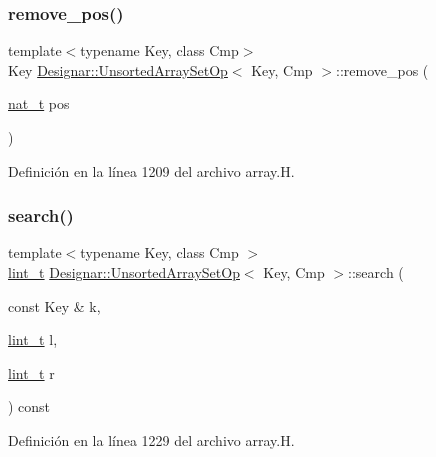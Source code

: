 \subsubsection{\texorpdfstring{remove\+\_\+pos()}{remove\_pos()}}
{\footnotesize\ttfamily template$<$typename Key, class Cmp$>$ \\
Key \hyperlink{class_designar_1_1_unsorted_array_set_op}{Designar\+::\+Unsorted\+Array\+Set\+Op}$<$ Key, Cmp $>$\+::remove\+\_\+pos (\begin{DoxyParamCaption}\item[{\hyperlink{namespace_designar_aa72662848b9f4815e7bf31a7cf3e33d1}{nat\+\_\+t}}]{pos }\end{DoxyParamCaption})\hspace{0.3cm}{\ttfamily [inline]}}



Definición en la línea 1209 del archivo array.\+H.

\mbox{\label{class_designar_1_1_unsorted_array_set_op_ac53cf73a36b29889fecf4bf06196e561}} 
\subsubsection{\texorpdfstring{search()}{search()}}
{\footnotesize\ttfamily template$<$typename Key, class Cmp $>$ \\
\hyperlink{namespace_designar_a9d113d66a39e82b73727c72cd3a52f73}{lint\+\_\+t} \hyperlink{class_designar_1_1_unsorted_array_set_op}{Designar\+::\+Unsorted\+Array\+Set\+Op}$<$ Key, Cmp $>$\+::search (\begin{DoxyParamCaption}\item[{const Key \&}]{k,  }\item[{\hyperlink{namespace_designar_a9d113d66a39e82b73727c72cd3a52f73}{lint\+\_\+t}}]{l,  }\item[{\hyperlink{namespace_designar_a9d113d66a39e82b73727c72cd3a52f73}{lint\+\_\+t}}]{r }\end{DoxyParamCaption}) const\hspace{0.3cm}{\ttfamily [protected]}}



Definición en la línea 1229 del archivo array.\+H.

\mbox{\label{class_designar_1_1_unsorted_array_set_op_a620fa45eb4c7ec033569321ecdb2eace}} 
